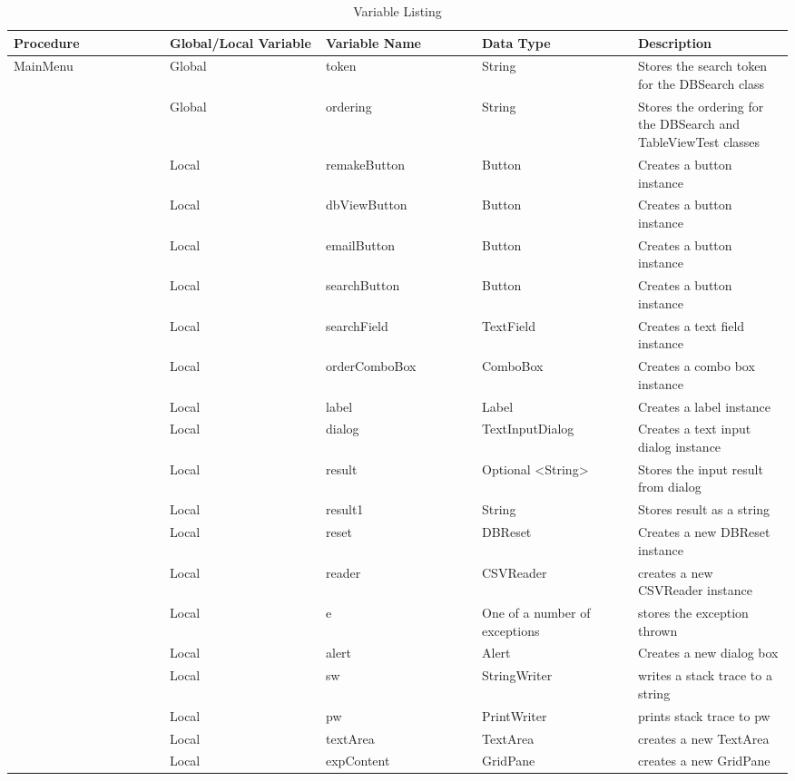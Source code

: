 \documentclass[11pt]{report}
\begin{document}
	\begin{longtable}{|p{0.2\linewidth}|p{0.2\linewidth}|p{0.2\linewidth}|p{0.2\linewidth}|p{0.2\linewidth}|}
			\caption{Variable Listing}\\
			\hline
			Procedure & Global/Local Variable & Variable Name & Data Type & Description \\[0.5ex]
			\hline
			\endhead
			\hline
			\endfoot
			MainMenu & Global & token & String & Stores the search token for the DBSearch class\\
			 & Global & ordering & String & Stores the ordering for the DBSearch and TableViewTest classes\\
			 & Local & remakeButton & Button & Creates a button instance\\
			 & Local & dbViewButton & Button & Creates a button instance\\
			 & Local & emailButton & Button & Creates a button instance\\
			 & Local & searchButton & Button & Creates a button instance\\
			 & Local & searchField & TextField & Creates a text field instance\\
			 & Local & orderComboBox & ComboBox & Creates a combo box instance\\
			 & Local & label & Label & Creates a label instance\\
			 & Local & dialog & TextInputDialog & Creates a text input dialog instance \\
			 & Local & result & Optional <String> & Stores the input result from dialog\\
			 & Local & result1 & String & Stores result as a string \\
			 & Local & reset & DBReset & Creates a new DBReset instance\\
			 & Local & reader & CSVReader & creates a new CSVReader instance \\
			 & Local & e & One of a number of exceptions & stores the exception thrown \\
			 & Local & alert & Alert & Creates a new dialog box\\
			 & Local & sw & StringWriter & writes a stack trace to a string \\
			 & Local & pw & PrintWriter & prints stack trace to pw \\
			 & Local & textArea & TextArea & creates a new TextArea \\
			 & Local & expContent & GridPane & creates a new GridPane\\

\end{longtable}
\end{document}
